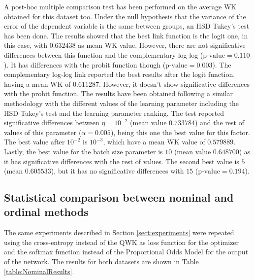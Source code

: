 \documentclass[journal]{IEEEtran}
\begin{document}
	A post-hoc multiple comparison test has been performed on the average WK obtained for this dataset too. Under the null hypothesis that the variance of the error of the dependent variable is the same between groups, an HSD Tukey's test has been done. The results showed that the best link function is the logit one, in this case, with $0.632438$ as mean WK value. However, there are not significative differences between this function and the complementary log-log ($\text{p-value}=0.110$). It has differences with the probit function though ($\text{p-value} = 0.003$). The complementary log-log link reported the best results after the logit function, having a mean WK of $0.611287$. However, it doesn't show significative differences with the probit function.
	The results have been obtained following a similar methodology with the different values of the learning parameter including the HSD Tukey's test and the learning parameter ranking. The test reported significative differences between $\eta=10^{-2}$ (mean value $0.733784$) and the rest of values of this parameter ($\alpha=0.005$), being this one the best value for this factor. The best value after $10^{-2}$ is $10^{-3}$, which have a mean WK value of $0.579889$. Lastly, the best value for the batch size parameter is $10$ (mean value $0.648700$) as it has significative differences with the rest of values. The second best value is $5$ (mean $0.605533$), but it has no significative differences with $15$ ($\text{p-value}= 0.194$).
	
	\subsection{Statistical comparison between nominal and ordinal methods}
	\label{app:NominalComparison}
	
	The same experiments described in Section \ref{sect:experiments} were repeated using the cross-entropy instead of the QWK as loss function for the optimizer and the softmax function instead of the Proportional Odds Model for the output of the network.
	The results for both datasets are shown in Table \ref{table:NominalResults}.
	
\end{document}
